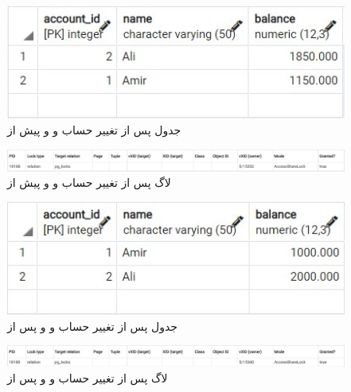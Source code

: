 \documentclass{article}
\begin{document}
\subsection{}
\begin{figure}[H]
    \centering
    \includegraphics[width=1\textwidth]{figures/8-c-1.jpg}
    \caption
	{
جدول  پس از تغییر حساب  و  و پیش از 
	}
    \label{fig:fig1}
\end{figure}
\begin{figure}[H]
    \centering
    \includegraphics[width=1\textwidth]{figures/8-c-2.jpg}
    \caption
	{
لاگ پس از تغییر حساب  و  و پیش از 
	}
    \label{fig:fig1}
\end{figure}
\begin{figure}[H]
    \centering
    \includegraphics[width=1\textwidth]{figures/8-c-3.jpg}
    \caption
	{
جدول  پس از تغییر حساب  و  و پس از 
	}
    \label{fig:fig1}
\end{figure}
\begin{figure}[H]
    \centering
    \includegraphics[width=1\textwidth]{figures/8-c-4.jpg}
    \caption
	{
لاگ پس از تغییر حساب  و  و پس از 
	}
    \label{fig:fig1}
\end{figure}
\end{document}
